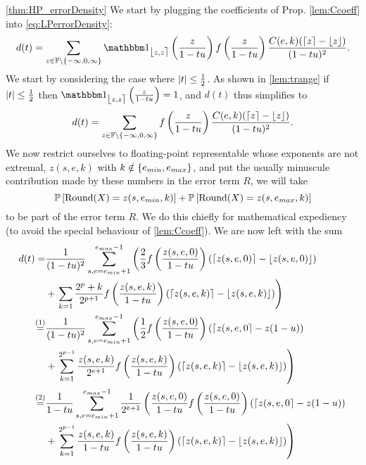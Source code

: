 \begin{myproof}{\cref{thm:HP_errorDensity}}
We start by plugging the coefficients of Prop. \ref{lem:Ccoeff} into \cref{eq:LPerrorDensity}:
\begin{align*}
d(t)=\sum_{z\in\F\setminus\{-\infty,0,\infty\}}\one_{\fintvl[z]}\left(\frac{z}{1-t\uro}\right) f\left(\frac{z}{1-t\uro}\right) \frac{C(e,k) (\ceil{z}-\floor{z})}{(1-t\uro)^2}.
\end{align*}
We start by considering the case where $\left\lvert t\right\rvert\leq \frac{1}{2}$. As shown in \cref{lem:trange} if $\left\lvert t\right\rvert\leq \frac{1}{2}$ then $\one_{\fintvl[z]}\left(\frac{z}{1-t\uro}\right) = 1$, and $d(t)$ thus simplifies to
\begin{align*}
d(t)=\sum_{z\in\mathbb{F}\setminus\{-\infty,0,\infty\}} f\left(\frac{z}{1-tu}\right) \frac{C(e,k) (\lceil z \rceil-\lfloor z \rfloor)}{(1-tu)^2}.
\end{align*}
We now restrict ourselves to floating-point representable whose exponents are not extremal, \ie $z(s,e,k)$ with $k\notin\{e_{min},e_{max}\}$, and put the usually minuscule contribution made by these numbers in the error term $R$, \ie we will take
 \[
 \mathbb{P}\left[ \mathrm{Round}(X)=z(s,e_{min}, k) \right] +  \mathbb{P}\left[ \mathrm{Round}(X)=z(s,e_{max}, k) \right] 
 \]
to be part of the error term $R$. We do this chiefly for mathematical expediency (to avoid the special behaviour of \cref{lem:Ccoeff}).
We are now left with the sum 
\begin{align}
d(t) =& \frac{1}{(1-t\uro)^2} \sum_{s, e=\emin+1}^{\emax-1} \left(\frac{2}{3}f\left(\frac{z(s,e,0)}{1-t\uro}\right)(\ceil{z(s,e,0)}-\floor{z(s,e,0)})\right. \nonumber\\
&
+\left. \sum_{k=1} \frac{2^p+k}{2^{p+1}} f\left(\frac{z(s,e,k)}{1-t\uro}\right)(\ceil{z(s,e,k)}-\floor{z(s,e,k)}) \right)\nonumber
\\
\stackrel{(1)}{=} & \frac{1}{(1-t\uro)^2} \sum_{s, e=\emin+1}^{\emax-1} \left(\frac{1}{2}f\left(\frac{z(s,e,0)}{1-t\uro}\right)(\ceil{z(s,e,0}-z(1-\uro))\right.\nonumber\\
&
+\left. \sum_{k=1}^{2^{p-1}} \frac{z(s,e,k)}{2^{e+1}} f\left(\frac{z(s,e,k)}{1-t\uro}\right)(\ceil{z(s,e,k)}-\floor{z(s,e,k)}) \right)
\nonumber\\
\stackrel{(2)}{=} & \frac{1}{1-t\uro} \sum_{s, e=\emin+1}^{\emax-1}\frac{1}{2^{e+1}} \left(\frac{z(s,e,0)}{1-t\uro}f\left(\frac{z(s,e,0)}{1-t\uro}\right)(\ceil{z(s,e,0}-z(1-\uro))\right.\nonumber\\
&
+\left. \sum_{k=1}^{2^{p-1}} \frac{z(s,e,k)}{1-t\uro} f\left(\frac{z(s,e,k)}{1-t\uro}\right)(\ceil{z(s,e,k)}-\floor{z(s,e,k)}) \right)

\end{align}
\end{myproof}
